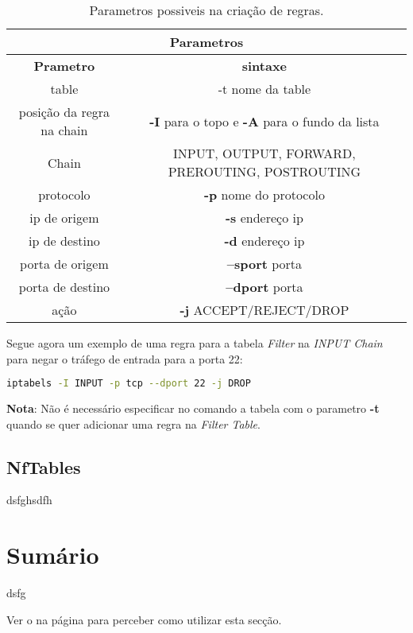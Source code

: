 \begin{table}
\centering
\begin{tabular}{|c|c|}
\hline
\multicolumn{2}{|c|}{Parametros}\\
\hline
\textbf{Prametro} & \textbf{sintaxe} \\
\hline
table & -t nome da table \\
\hline
posição da regra na chain & \textbf{-I} para o topo e \textbf{-A} para o fundo da lista \\
\hline
Chain& INPUT, OUTPUT, FORWARD, PREROUTING, POSTROUTING \\
\hline
protocolo & \textbf{-p} nome do protocolo  \\
\hline
ip de origem & \textbf{-s} endereço ip  \\
\hline
ip de destino & \textbf{-d} endereço ip  \\
\hline
porta de origem & \textbf{--sport} porta  \\
\hline
porta de destino & \textbf{--dport} porta  \\
\hline
ação & \textbf{-j} ACCEPT/REJECT/DROP  \\
\hline
\end{tabular}
\caption{Parametros possiveis na criação de regras.}
\label{ipt2args}
\end{table}

Segue agora um exemplo de uma regra para a tabela \textit{Filter} na 
\textit{INPUT Chain} para negar o tráfego de entrada para a porta 22:

\begin{lstlisting}[language=Bash, caption={exemplo de comando}]
iptabels -I INPUT -p tcp --dport 22 -j DROP
\end{lstlisting}

\textbf{Nota}: Não é necessário especificar no comando a tabela  com o parametro
\textbf{-t} quando se quer adicionar uma regra na \textit{Filter Table}.

\subsection{NfTables}

dsfghsdfh

\section*{Sumário}

dsfg

Ver o  na página \pageref{sec:intro_summary} para perceber como utilizar esta secção.
